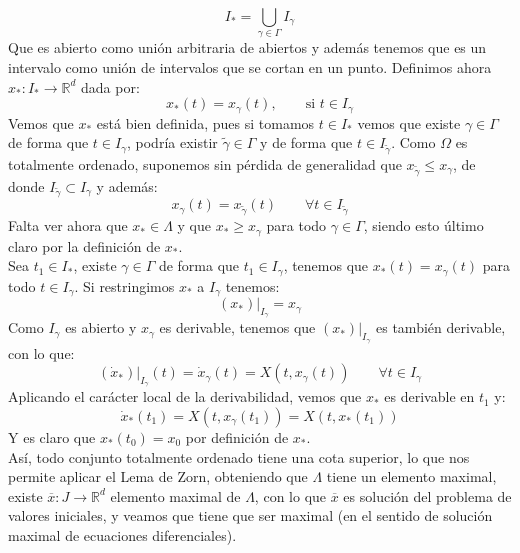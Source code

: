 \begin{ejercicio}
\begin{equation*}
        I_\ast = \bigcup_{\gamma \in  \Gamma} I_\gamma
    \end{equation*}
    Que es abierto como unión arbitraria de abiertos y además tenemos que es un intervalo como unión de intervalos que se cortan en un punto. Definimos ahora $x_\ast:I_\ast\to \mathbb{R}^d$ dada por:
    \begin{equation*}
        x_\ast(t) = x_\gamma(t), \qquad \text{si\ } t\in I_\gamma
    \end{equation*}
    Vemos que $x_\ast$ está bien definida, pues si tomamos $t\in I_\ast$ vemos que existe $\gamma\in \Gamma$ de forma que $t\in I_\gamma$, podría existir $\tilde{\gamma}\in \Gamma$ y de forma que $t\in I_{\tilde{\gamma}}$. Como $\Omega$ es totalmente ordenado, suponemos sin pérdida de generalidad que $x_{\tilde{\gamma}} \leq x_\gamma$, de donde $I_{\tilde{\gamma}}\subset I_\gamma$ y además:
    \begin{equation*}
        x_\gamma(t) = x_{\tilde{\gamma}}(t) \qquad \forall t\in I_{\tilde{\gamma}}
    \end{equation*}
    Falta ver ahora que $x_\ast \in \Lambda$ y que $x_\ast \geq x_\gamma$ para todo $\gamma\in \Gamma$, siendo esto último claro por la definición de $x_\ast$.\\

    \noindent
    Sea $t_1\in I_\ast$, existe $\gamma\in \Gamma$ de forma que $t_1\in I_\gamma$, tenemos que $x_\ast(t) = x_\gamma(t)$ para todo $t\in I_\gamma$. Si restringimos $x_\ast$ a $I_\gamma$ tenemos:
    \begin{equation*}
        (x_\ast)\big|_{I_\gamma} = x_\gamma
    \end{equation*}
    Como $I_{\gamma}$ es abierto y $x_\gamma$ es derivable, tenemos que $(x_\ast)\big|_{I_\gamma}$ es también derivable, con lo que:
    \begin{equation*}
        (\dot{x}_\ast)\big|_{I_\gamma}(t) = \dot{x}_\gamma(t) = X(t,x_\gamma(t)) \qquad \forall t\in I_\gamma
    \end{equation*}
    Aplicando el carácter local de la derivabilidad, vemos que $x_\ast$ es derivable en $t_1$ y:
    \begin{equation*}
        \dot{x}_\ast(t_1) = X(t,x_\gamma(t_1)) = X(t,x_\ast(t_1))
    \end{equation*}
    Y es claro que $x_\ast(t_0) = x_0$ por definición de $x_\ast$.\\

    \noindent
    Así, todo conjunto totalmente ordenado tiene una cota superior, lo que nos permite aplicar el Lema de Zorn, obteniendo que $\Lambda$ tiene un elemento maximal, existe $\overline{x}:J\to \mathbb{R}^d$ elemento maximal de $\Lambda$, con lo que $\overline{x}$ es solución del problema de valores iniciales, y veamos que tiene que ser maximal (en el sentido de solución maximal de ecuaciones diferenciales).\\


\end{ejercicio}
